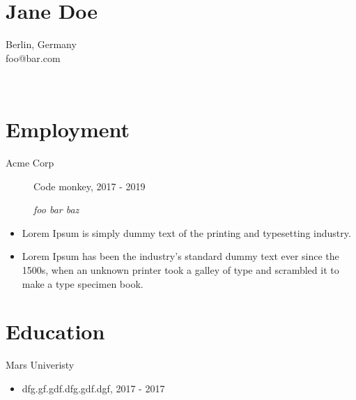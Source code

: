 \documentclass[12pt]{article}
\begin{document}
\section{Jane Doe}
Berlin, Germany\\
foo@bar.com

\vspace{0.05\textheight}
​
\hspace*{-0.05\textwidth}
\begin{minipage}[t]{0.6\textwidth}
\section{Employment}

\begin{description}
    \item [Acme Corp] Code monkey, 2017 - 2019
    \item [] \footnotesize\textsl{
     foo  bar  baz 
    }
\end{description}
\begin{itemize}[leftmargin=0.05\textwidth]
    
    \item Lorem Ipsum is simply dummy text of the printing and typesetting industry.
    
    \item Lorem Ipsum has been the industry's standard dummy text ever since the 1500s, when an unknown printer took a galley of type and scrambled it to make a type specimen book.
    
\end{itemize}

\section{Education}

\begin{description}
    \item [Mars Univeristy]
\end{description}
\begin{itemize}[leftmargin=0.05\textwidth]
    \item dfg.gf.gdf.dfg.gdf.dgf, 2017 - 2017
\end{itemize}

\end{minipage}
\noindent
\hspace{0.05\textwidth}
\end{document}
